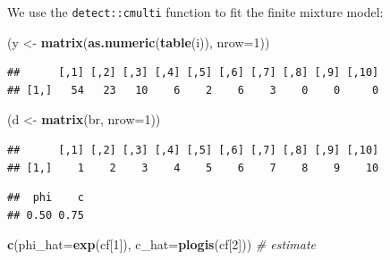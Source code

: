 \documentclass[12pt,]{book}
\newenvironment{Shaded}{\begin{snugshade}}{\end{snugshade}}
\newcommand{\CommentTok}[1]{\textcolor[rgb]{0.56,0.35,0.01}{\textit{#1}}}
\newcommand{\DataTypeTok}[1]{\textcolor[rgb]{0.13,0.29,0.53}{#1}}
\newcommand{\DecValTok}[1]{\textcolor[rgb]{0.00,0.00,0.81}{#1}}
\newcommand{\KeywordTok}[1]{\textcolor[rgb]{0.13,0.29,0.53}{\textbf{#1}}}
\newcommand{\NormalTok}[1]{#1}
\newcommand{\OperatorTok}[1]{\textcolor[rgb]{0.81,0.36,0.00}{\textbf{#1}}}
\newcommand{\StringTok}[1]{\textcolor[rgb]{0.31,0.60,0.02}{#1}}
\begin{document}
We use the \texttt{detect::cmulti} function to fit the finite mixture model:

\begin{Shaded}
\begin{Highlighting}[]
\NormalTok{(y <-}\StringTok{ }\KeywordTok{matrix}\NormalTok{(}\KeywordTok{as.numeric}\NormalTok{(}\KeywordTok{table}\NormalTok{(i)), }\DataTypeTok{nrow=}\DecValTok{1}\NormalTok{))}
\end{Highlighting}
\end{Shaded}

\begin{verbatim}
##      [,1] [,2] [,3] [,4] [,5] [,6] [,7] [,8] [,9] [,10]
## [1,]   54   23   10    6    2    6    3    0    0     0
\end{verbatim}

\begin{Shaded}
\begin{Highlighting}[]
\NormalTok{(d <-}\StringTok{ }\KeywordTok{matrix}\NormalTok{(br, }\DataTypeTok{nrow=}\DecValTok{1}\NormalTok{))}
\end{Highlighting}
\end{Shaded}

\begin{verbatim}
##      [,1] [,2] [,3] [,4] [,5] [,6] [,7] [,8] [,9] [,10]
## [1,]    1    2    3    4    5    6    7    8    9    10
\end{verbatim}

\begin{Shaded}
\end{Shaded}

\begin{verbatim}
##  phi    c 
## 0.50 0.75
\end{verbatim}

\begin{Shaded}
\begin{Highlighting}[]
\KeywordTok{c}\NormalTok{(}\DataTypeTok{phi_hat=}\KeywordTok{exp}\NormalTok{(cf[}\DecValTok{1}\NormalTok{]), }\DataTypeTok{c_hat=}\KeywordTok{plogis}\NormalTok{(cf[}\DecValTok{2}\NormalTok{])) }\CommentTok{# estimate}
\end{Highlighting}
\end{Shaded}
\end{document}
